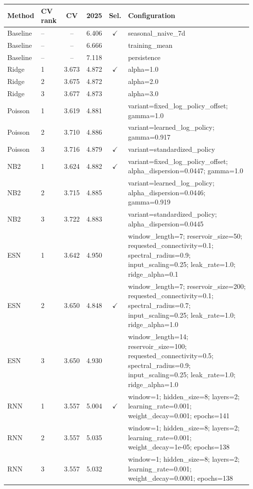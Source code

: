 \begin{tabular}{@{}llcccp{11.4cm}@{}}
\toprule
Method & CV rank & CV & 2025 & Sel. & Configuration \\ \midrule
Baseline & -- & -- & 6.406 & $\checkmark$ & seasonal\_naive\_7d \\
Baseline & -- & -- & 6.666 &  & training\_mean \\
Baseline & -- & -- & 7.118 &  & persistence \\
Ridge & 1 & 3.673 & 4.872 & $\checkmark$ & alpha=1.0 \\
Ridge & 2 & 3.675 & 4.872 &  & alpha=2.0 \\
Ridge & 3 & 3.677 & 4.873 &  & alpha=3.0 \\
Poisson & 1 & 3.619 & 4.881 &  & variant=fixed\_log\_policy\_offset; gamma=1.0 \\
Poisson & 2 & 3.710 & 4.886 &  & variant=learned\_log\_policy; gamma=0.917 \\
Poisson & 3 & 3.716 & 4.879 & $\checkmark$ & variant=standardized\_policy \\
NB2 & 1 & 3.624 & 4.882 & $\checkmark$ & variant=fixed\_log\_policy\_offset; alpha\_dispersion=0.0447; gamma=1.0 \\
NB2 & 2 & 3.715 & 4.885 &  & variant=learned\_log\_policy; alpha\_dispersion=0.0446; gamma=0.919 \\
NB2 & 3 & 3.722 & 4.883 &  & variant=standardized\_policy; alpha\_dispersion=0.0445 \\
ESN & 1 & 3.642 & 4.950 &  & window\_length=7; reservoir\_size=50; requested\_connectivity=0.1; spectral\_radius=0.9; input\_scaling=0.25; leak\_rate=1.0; ridge\_alpha=0.1 \\
ESN & 2 & 3.650 & 4.848 & $\checkmark$ & window\_length=7; reservoir\_size=200; requested\_connectivity=0.1; spectral\_radius=0.7; input\_scaling=0.25; leak\_rate=1.0; ridge\_alpha=1.0 \\
ESN & 3 & 3.650 & 4.930 &  & window\_length=14; reservoir\_size=100; requested\_connectivity=0.5; spectral\_radius=0.9; input\_scaling=0.25; leak\_rate=1.0; ridge\_alpha=1.0 \\
RNN & 1 & 3.557 & 5.004 & $\checkmark$ & window=1; hidden\_size=8; layers=2; learning\_rate=0.001; weight\_decay=0.001; epochs=141 \\
RNN & 2 & 3.557 & 5.035 &  & window=1; hidden\_size=8; layers=2; learning\_rate=0.001; weight\_decay=1e-05; epochs=138 \\
RNN & 3 & 3.557 & 5.032 &  & window=1; hidden\_size=8; layers=2; learning\_rate=0.001; weight\_decay=0.0001; epochs=138 \\

\end{tabular}

